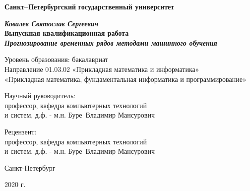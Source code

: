 
\begin{titlepage}
\begin{center}
\textbf{Санкт--Петербургский}
\textbf{государственный университет}

\vspace{35mm}

\textbf{\textit{\large Ковалев Святослав Сергеевич}} \\[8mm]
\textbf{\large Выпускная квалификационная работа}\\[3mm]
\textbf{\textit{\large Прогнозирование временных рядов методами машинного обучения}}

\vspace{20mm}
Уровень образования: бакалавриат\\
Направление 01.03.02 «Прикладная математика и информатика»\\
«Прикладная математика, фундаментальная информатика и программирование»\\


\begin{flushright}
{Научный руководитель:} \\
профессор, кафедра компьютерных технологий \\ и систем, д.ф. - м.н.  Буре~Владимир Мансурович
\end{flushright}
\begin{flushright}
{Рецензент:} \\
профессор, кафедра компьютерных технологий \\и систем, д.ф. - м.н.  Буре~Владимир Мансурович
\end{flushright}

\vfill 

{Санкт-Петербург}
\par{2020 г.}
\end{center}
\end{titlepage}
\restoregeometry
\addtocounter{page}{1}